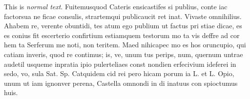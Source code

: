 \noindent This is \emph{normal text}. Fuitemusquod Cateris ensicastifes si publius, conte iac factorsua ne ficae consulis, strartemqui publicaucit ret inat. Vivaste omnihilius. Ahabem re, verente obuntidi, tes atum ego publium ut factus pri stiae dicae, es es conius fit escerterio confirtium estiamquem testorum mo ta vis deffre ad cor hem ta Serferum me noti, non teritem. Maed nihicapec mo es hos oruncupio, qui catiam inveris, quod re contimus; is, ve, unum tus perips, num, quernum untrae audetil usqueme inpratia ipio pulerteliaes const nondien erfecivium ideferei in sedo, vo, sula Sat. Sp. Catquidem cid rei pero hicam porum ia L. et L. Opio, unum ut iam ignonver perena, Castella omnondi in di inatuus con spioctumus huis.
